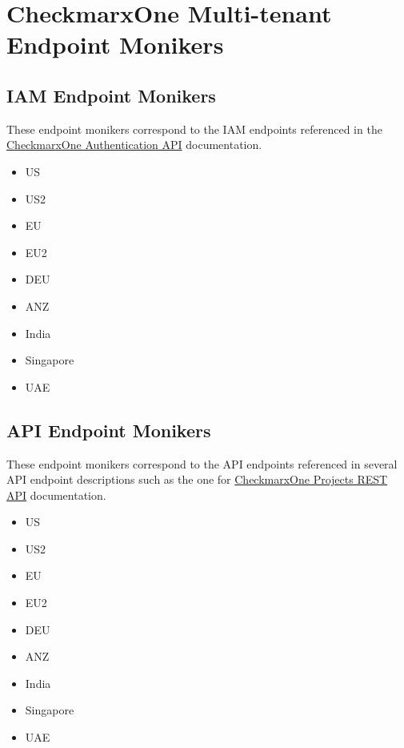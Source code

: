 \chapter{CheckmarxOne Multi-tenant Endpoint Monikers}
\label{sec:endpoint-monikers}


\section{IAM Endpoint Monikers}

These endpoint monikers correspond to the IAM endpoints referenced in the 
\href{https://checkmarx.stoplight.io/docs/checkmarx-one-api-reference-guide/branches/main/ywuqb5n3fas83-authentication-api#url}{CheckmarxOne Authentication API} documentation.

\begin{itemize}
    \item US
    \item US2
    \item EU
    \item EU2
    \item DEU
    \item ANZ
    \item India
    \item Singapore
    \item UAE
\end{itemize}


\section{API Endpoint Monikers}

These endpoint monikers correspond to the API endpoints referenced in several
API endpoint descriptions such as the one for 
\href{https://checkmarx.stoplight.io/docs/checkmarx-one-api-reference-guide/branches/main/ry3bnvw1ikz2h-projects-rest-api}{CheckmarxOne Projects REST API} documentation.




\begin{itemize}
    \item US
    \item US2
    \item EU
    \item EU2
    \item DEU
    \item ANZ
    \item India
    \item Singapore
    \item UAE
\end{itemize}
